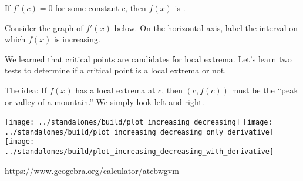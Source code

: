 \documentclass[../main.tex]{subfiles}
\begin{document}
  \faStar{} If \(f'(c) = 0\) for some constant \(c\), then \(f(x)\) is \underline{\hspace{3.5in}}.

  \begin{example}
    Consider the graph of \(f'(x)\) below. On the horizontal axis, label the interval on which \(f(x)\) is increasing. 

    \begin{center}
    \end{center}
  \end{example}

  We learned that critical points are candidates for local extrema. Let's learn two tests to determine if a critical point is a local extrema or not.

  The idea: If \(f(x)\) has a local extrema at \(c\), then \((c,f(c))\) must be the ``peak or valley of a mountain.''  We simply look left and right.
  \begin{center}
    \texttt{[image: ../standalones/build/plot\_increasing\_decreasing]}
    \hfill
    \texttt{[image: ../standalones/build/plot\_increasing\_decreasing\_only\_derivative]}
    \hfill
    \texttt{[image: ../standalones/build/plot\_increasing\_decreasing\_with\_derivative]}

    \url{https://www.geogebra.org/calculator/atcbwgvm}
  \end{center}
  \clearpage
\end{document}
